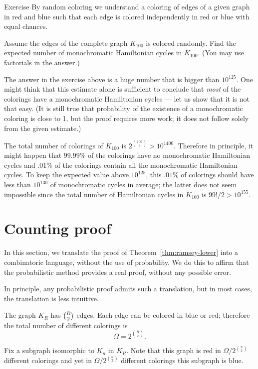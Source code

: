 \begin{thm}{Exercise}
By random coloring we understand a coloring of edges of a given graph in red and blue such that each edge is colored independently in red or blue with equal chances. 

Assume the edges of the complete graph $K_{100}$ is colored randomly. 
Find the expected number of monochromatic Hamiltonian cycles in $K_{100}$.
(You may use factorials in the answer.)
\end{thm} 

The answer in the exercise above is a huge number that is bigger than $10^{125}$.
One might think that this estimate alone is sufficient to conclude that {}\emph{most} of the colorings have a monochromatic Hamiltonian cycles --- let us show that it is not that easy.
(It is still true that probability of the existence of a monochromatic coloring is close to 1, but the proof requires more work; it does not follow solely from the given estimate.)

The total number of colorings of $K_{100}$ is $2^{\binom{100}2}>10^{1400}$.
Therefore in principle, it might happen that $99.99\%$ of the colorings have no monochromatic Hamiltonian cycles and $.01\%$ of the colorings contain all the monochromatic Hamiltonian cycles.
To keep the expected value above $10^{125}$,
this $.01\%$ of colorings should have less than $10^{130}$ of monochromatic cycles in average;
the latter does not seem impossible since the total number of Hamiltonian cycles in $K_{100}$ is $99!/2>10^{155}$.

\section*{Counting proof}

In this section, we translate the proof of Theorem~\ref{thm:ramsey-lower} into a combinatoric language, without the use of probability.
We do this to affirm that the probabilistic method provides a real proof, without any possible error.

In principle,  any probabilistic proof admits such a translation,
but in most cases, the translation is less intuitive. 

The graph $K_R$ has $\tbinom{R}{2}$ edges.
Each edge can be colored in blue or red;
therefore the total number of different colorings is \[\Omega=2^{\binom{R}{2}}.\]

Fix a subgraph isomorphic to $K_n$ in $K_R$.
Note that this graph is red in $\Omega/2^{\binom n2}$ different colorings
and yet in $\Omega/2^{\binom n2}$ different colorings this subgraph is blue.

